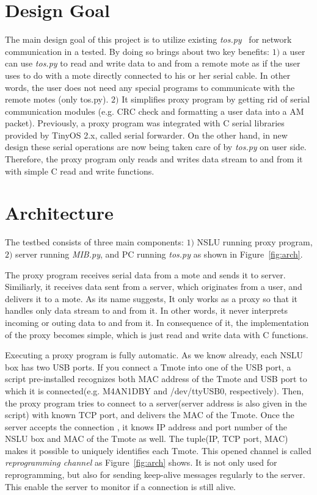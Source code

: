 \documentclass[10pt,conference]{IEEEtran}
\newcommand\spar[1]{\vspace{1ex}\noindent{\bf #1}}
\begin{document}
\section{Design Goal}
The main design goal of this project is to utilize existing
\textit{tos.py}~\cite{tos.py} for network communication in a tested.  By doing
so brings about two key benefits: $1)$ a user can use \textit{tos.py} to read
and write data to and from a remote mote as if the user uses to do with a mote
directly connected to his or her serial cable.  In other words, the user does
not need any special programs to communicate with the remote motes (only
tos.py).  $2)$ It simplifies proxy program by getting rid of serial
communication modules (e.g.  CRC check and formatting a user data into a AM
packet).  Previously, a proxy program was integrated with C serial libraries
provided by TinyOS 2.x, called serial forwarder.  On the other hand, in new
design these serial operations are now being taken care of by \textit{tos.py}
on user side.  Therefore, the proxy program only reads and writes data stream
to and from it with simple C read and write functions.

\section{Architecture} \label{sec:arch}
The testbed consists of three main components: $1)$ NSLU running proxy program, 
$2)$ server running \textit{MIB.py}, and PC running \textit{tos.py} as shown 
in Figure~\ref{fig:arch}. 

\spar{NSLU running proxy program.} The proxy program receives serial data from
a mote and sends it to server.  Similiarly, it receives data sent from a
server, which originates from a user, and delivers it to a mote.  As its name
suggests, It only works as a proxy so that it handles only data stream to and
from it.  In other words, it never interprets incoming or outing data to and from it.
In consequence of it, the implementation of the proxy becomes simple, which is
just read and write data with C functions.

Executing a proxy program is fully automatic.  As we know already, each NSLU
box has two USB ports.  If you connect a Tmote into one of the USB port, a
script pre-installed recognizes both MAC address of the Tmote and USB port to
which it is connected(e.g.  M4AN1DBY and /dev/ttyUSB0, respectively).  Then,
the proxy program tries to connect to a server(server address is also given in
the script) with known TCP port, and delivers the MAC of the Tmote.  Once the
server accepts the connection , it knows IP address and port number of the NSLU
box and MAC of the Tmote as well.  The tuple(IP, TCP port, MAC) makes it
possible to uniquely identifies each Tmote.  This opened channel is called
\textit{reprogramming channel} as Figure~\ref{fig:arch} shows.  It is not only
used for reprogramming, but also for sending keep-alive messages regularly to
the server.  This enable the server to monitor if a connection is still alive.
\end{document}
